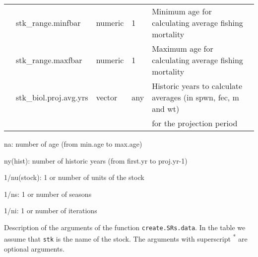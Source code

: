 \begin{landscape}
\begin{table}[!ht]
\begin{footnotesize}
\begin{threeparttable}
\begin{tabular}{lllll}
          & stk\_range.minfbar   &	numeric &	1 &	Minimum age for calculating average fishing mortality\\
          & stk\_range.maxfbar   &	numeric &	1 &	Maximum age for calculating average fishing mortality \\
          & stk\_biol.proj.avg.yrs &	vector &	any &	Historic years to calculate averages (in spwn, fec, m and wt)\\
          &  &	&	&	for the projection period\\
        \hline
      \end{tabular}
      
      \begin{tablenotes}
        \item na: number of age (from min.age to max.age)
        \item ny(hist): number of historic years (from first.yr to proj.yr-1)
        \item 1/nu(stock): 1 or number of units of the stock
        \item 1/ns: 1 or number of seasons
        \item 1/ni:  1 or number of iterations
      \end{tablenotes}
      
    \end{threeparttable}
  \end{footnotesize}

\end{table}			

	

\begin{table}[!ht]

  \centering
  \begin{footnotesize}
    
    \caption{Description of the arguments of the function \texttt{create.SRs.data}. 
      In the table we assume that \texttt{stk} is the name of the stock. 
      The arguments with superscript \textsuperscript{*} are optional arguments.}
      
    \label{tb:A4.table2}
    
    \begin{threeparttable}
    

\end{threeparttable}
\end{footnotesize}
\end{table}
\end{landscape}
